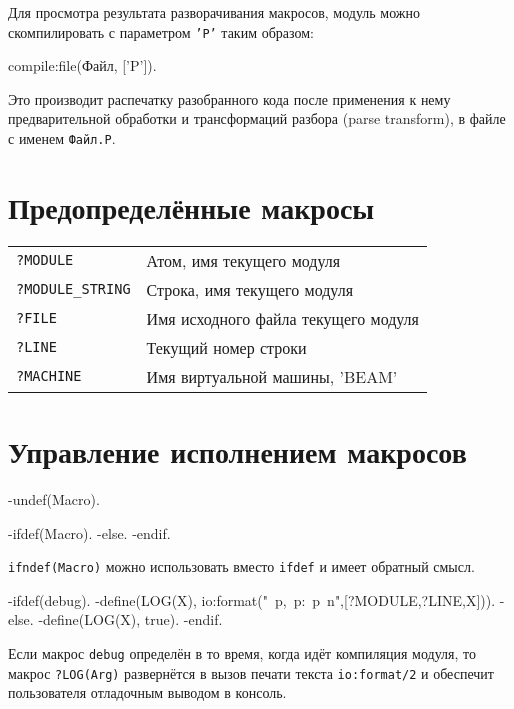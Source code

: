 Для просмотра результата разворачивания макросов, модуль можно скомпилировать с
параметром \texttt{'P'} таким образом:

\begin{erlangru}
compile:file(Файл, ['P']).
\end{erlangru}

Это производит распечатку разобранного кода после применения к нему 
предварительной обработки и трансформаций разбора (parse transform), в файле с 
именем \texttt{Файл.P}.


\section{Предопределённые макросы}

\begin{center}
\begin{tabular}{|>{\raggedright}p{110pt}|>{\raggedright}p{250pt}|}
\hline
\multicolumn{2}{|p{330pt}|}{Предопределённые макросы}\tabularnewline
\hline
\texttt{?MODULE} & 
Атом, имя текущего модуля \tabularnewline
\hline
\texttt{?MODULE\_STRING} & 
Строка, имя текущего модуля \tabularnewline
\hline
\texttt{?FILE} & 
Имя исходного файла текущего модуля \tabularnewline
\hline
\texttt{?LINE} & 
Текущий номер строки \tabularnewline
\hline
\texttt{?MACHINE} & 
Имя виртуальной машины, 'BEAM'\tabularnewline
\hline
\end{tabular}
\end{center}


\section{Управление исполнением макросов}

\begin{erlang}
-undef(Macro).      %

-ifdef(Macro).
-else.
-endif.
\end{erlang}

\texttt{ifndef(Macro)} можно использовать вместо \texttt{ifdef} и имеет обратный
смысл.

\begin{erlang}
-ifdef(debug).
-define(LOG(X), io:format("{~p,~p}:~p~n",[?MODULE,?LINE,X])).
-else.
-define(LOG(X), true).
-endif.
\end{erlang}

Если макрос \texttt{debug} определён в то время, когда идёт компиляция модуля, 
то макрос \texttt{?LOG(Arg)} развернётся в вызов печати текста
\texttt{io:format/2} и обеспечит пользователя отладочным выводом в консоль.


